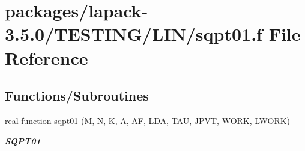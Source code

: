 \hypertarget{sqpt01_8f}{}\section{packages/lapack-\/3.5.0/\+T\+E\+S\+T\+I\+N\+G/\+L\+I\+N/sqpt01.f File Reference}
\label{sqpt01_8f}
\subsection*{Functions/\+Subroutines}
\begin{DoxyCompactItemize}
\item 
real \hyperlink{afunc_8m_a7b5e596df91eadea6c537c0825e894a7}{function} \hyperlink{group__single__lin_ga4b7d2749a88c51a56c53f9310ed70d5f}{sqpt01} (M, \hyperlink{polmisc_8c_a0240ac851181b84ac374872dc5434ee4}{N}, K, \hyperlink{classA}{A}, A\+F, \hyperlink{example__user_8c_ae946da542ce0db94dced19b2ecefd1aa}{L\+D\+A}, T\+A\+U, J\+P\+V\+T, W\+O\+R\+K, L\+W\+O\+R\+K)
\begin{DoxyCompactList}\small\item\em {\bfseries S\+Q\+P\+T01} \end{DoxyCompactList}\end{DoxyCompactItemize}
